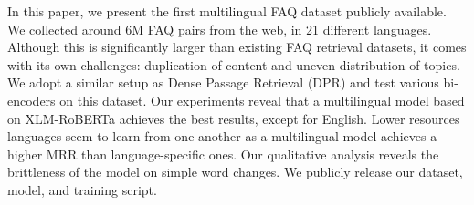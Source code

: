 In this paper, we present the first multilingual FAQ dataset publicly available. We collected around 6M FAQ pairs from the web, in 21 different languages. Although this is significantly larger than existing FAQ retrieval datasets, it comes with its own challenges: duplication of content and uneven distribution of topics. We adopt a similar setup as Dense Passage Retrieval (DPR) and test various bi-encoders on this dataset. Our experiments reveal that a multilingual model based on XLM-RoBERTa achieves the best results, except for English. Lower resources languages seem to learn from one another as a multilingual model achieves a higher MRR than language-specific ones. Our qualitative analysis reveals the brittleness of the model on simple word changes. We publicly release our dataset, model, and training script.
